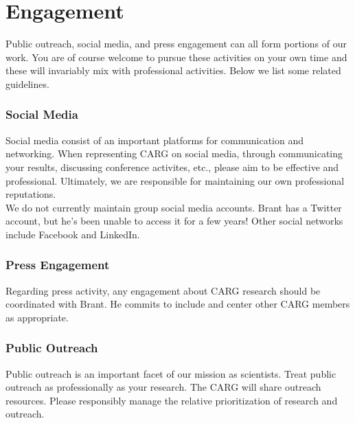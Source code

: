 \section{Engagement}
\label{sec:engagement}

Public outreach,
social media, and 
press engagement can
all form portions of our
work. You are of course 
welcome to pursue these
activities on your own
time and these will invariably
mix with professional 
activities. Below we 
list some related
guidelines.


\subsubsection{Social Media}
\label{sec:social_media}

Social media consist
of an important
platforms for communication
and networking.
When representing CARG
on social media, through
communicating your results,
discussing conference
activites, etc., please 
aim to be effective and
professional.
Ultimately, we are responsible
for maintaining our own
professional reputations.\\
\noindent
We do not currently maintain
group social media accounts.
Brant has a Twitter 
account, but he's been unable to access
it for a few years!
Other social networks
include Facebook and
LinkedIn.

\subsubsection{Press Engagement}
\label{sec:press_engagement}

Regarding press activity,
any engagement about
CARG research should be
coordinated with Brant.
He commits to include
and center other CARG 
members as appropriate.

\subsubsection{Public Outreach}
\label{sec:public_outreach}

Public outreach is an
important facet of our
mission as scientists.
Treat public outreach
as professionally as
your research. The
CARG will share
outreach resources.
Please responsibly manage
the relative prioritization
of
research and outreach.
